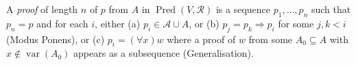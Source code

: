 A \emph{proof} of length $n$ of $p$ from $A$ in $\operatorname{Pred}(V, \mathcal{R})$ is a sequence $p_1, \ldots, p_n$ such that $p_n = p$ and for each $i$, either (a) $p_i \in \mathcal{A} \cup A$, or (b) $p_j = p_k \Rightarrow p_i$ for some $j, k < i$ (Modus Ponens), or (c) $p_i = (\forall x)w$ where a proof of $w$ from some $A_0 \subseteq A$ with $x \notin \operatorname{var}(A_0)$ appears as a subsequence (Generalisation).
